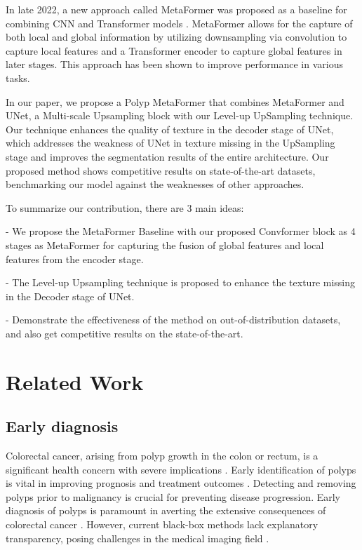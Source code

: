 \documentclass[conference]{IEEEtran}
\begin{document}
In late 2022, a new approach called MetaFormer was proposed as a baseline for combining CNN \cite{pvt} and Transformer models \cite{transformer}. MetaFormer \cite{metaformer} allows for the capture of both local and global information by utilizing downsampling via convolution to capture local features and a Transformer encoder to capture global features in later stages. This approach has been shown to improve performance in various tasks.

In our paper, we propose a Polyp MetaFormer that combines MetaFormer and UNet, a Multi-scale Upsampling block with our Level-up UpSampling technique. Our technique enhances the quality of texture in the decoder stage of UNet, which addresses the weakness of UNet in texture missing in the UpSampling stage and improves the segmentation results of the entire architecture. Our proposed method shows competitive results on state-of-the-art datasets, benchmarking our model against the weaknesses of other approaches. 


To summarize our contribution, there are 3 main ideas:

- We propose the MetaFormer Baseline with our proposed Convformer block as 4 stages as MetaFormer for capturing the fusion of global features and local features from the encoder stage.

- The Level-up Upsampling technique is proposed to enhance the texture missing in the Decoder stage of UNet.

- Demonstrate the effectiveness of the method on out-of-distribution datasets, and also get competitive results on the state-of-the-art.

\section{Related Work}

\subsection{Early diagnosis}
Colorectal cancer, arising from polyp growth in the colon or rectum, is a significant health concern with severe implications \cite{colectoral}. Early identification of polyps is vital in improving prognosis and treatment outcomes \cite{colectoral}. Detecting and removing polyps prior to malignancy is crucial for preventing disease progression. Early diagnosis of polyps is paramount in averting the extensive consequences of colorectal cancer \cite{endoscopic}. However, current black-box methods lack explanatory transparency, posing challenges in the medical imaging field \cite{colectoral}.
\end{document}
